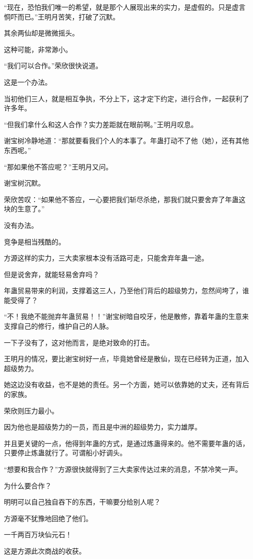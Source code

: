 \begin{this_body}
“现在，恐怕我们唯一的希望，就是那个人展现出来的实力，是虚假的。只是虚言恫吓而已。”王明月苦笑，打破了沉默。

其余两仙却是微微摇头。

这种可能，非常渺小。

“我们可以合作。”荣欣很快说道。

这是一个办法。

当初他们三人，就是相互争执，不分上下，这才定下约定，进行合作，一起获利了许多年。

“但我们拿什么和这人合作？实力差距就在眼前啊。”王明月叹息。

谢宝树冷静地道：“那就要看我们个人的本事了。年蛊打动不了他（她），还有其他东西呢。”

“那如果他不答应呢？”王明月又问。

谢宝树沉默。

荣欣苦叹：“如果他不答应，一心要把我们斩尽杀绝，那我们就只要舍弃了年蛊这块的生意了。”

没有办法。

竞争是相当残酷的。

方源这样的实力，三大卖家根本没有活路可走，只能舍弃年蛊一途。

但是说舍弃，就能轻易舍弃吗？

年蛊贸易带来的利润，支撑着这三人，乃至他们背后的超级势力，忽然间垮了，谁能受得了？

“不！我绝不能抛弃年蛊贸易！！”谢宝树暗自咬牙，他是散修，靠着年蛊的生意来支撑自己的修行，维护自己的人脉。

一下子没有了，这对他而言，是绝对致命的打击。

王明月的情况，要比谢宝树好一点，毕竟她曾经是散仙，现在已经转为正道，加入超级势力。

她这边没有收益，也不是她的责任。另一个方面，她可以依靠她的丈夫，还有背后的家族。

荣欣则压力最小。

因为他也是超级势力的一员，而且是中洲的超级势力，实力雄厚。

并且更关键的一点，他得到年蛊的方式，是通过炼蛊得来的。他不需要年蛊的话，只要停止炼蛊就行了。可谓船小好调头。

“想要和我合作？”方源很快就得到了三大卖家传达过来的消息，不禁冷笑一声。

为什么要合作？

明明可以自己独自吞下的东西，干嘛要分给别人呢？

方源毫不犹豫地回绝了他们。

一千两百万块仙元石！

这是方源此次商战的收获。


\end{this_body}
